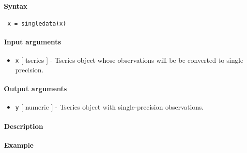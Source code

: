 


	\paragraph{Syntax}
 
 \begin{verbatim}
 x = singledata(x)
 \end{verbatim}
 
 \paragraph{Input arguments}
 
 \begin{itemize}
 \item
   \texttt{x} {[} tseries {]} - Tseries object whose observations will be
   be converted to single precision.
 \end{itemize}
 
 \paragraph{Output arguments}
 
 \begin{itemize}
 \item
   \texttt{y} {[} numeric {]} - Tseries object with single-precision
   observations.
 \end{itemize}
 
 \paragraph{Description}
 
 \paragraph{Example}


